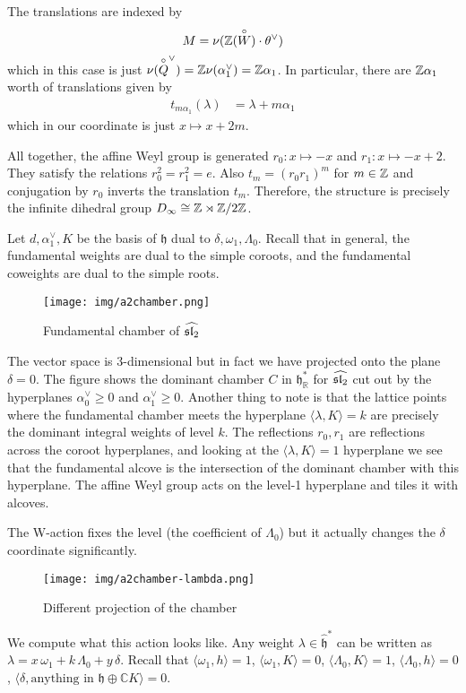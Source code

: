 \documentclass[12pt]{article}
\begin{document}
\begin{example}
The translations are indexed by \[M = \nu(\Z(\overset{\circ}{W})\cdot \theta^\vee)\] which in this case is just $\nu(\overset{\circ}{Q}^\vee) = \Z \nu(\alpha_1^\vee) = \Z \alpha_1$. In particular, there are $\Z\alpha_1$ worth of translations given by \begin{align*}
    t_{m\alpha_1}(\lambda) &= \lambda + m\alpha_1 
\end{align*} which in our coordinate is just $x \mapsto x + 2m$. 

All together, the affine Weyl group is generated $r_0:x \mapsto -x$ and $r_1:x \mapsto -x + 2$. They satisfy the relations $r_0^2 = r_1^2 = e$. Also $t_m = (r_0 r_1)^m$ for $m \in \Z$ and conjugation by $r_0$ inverts the translation $t_m$. Therefore, the structure is precisely the infinite dihedral group $D_\infty \cong \Z \rtimes \Z/2\Z$.
\end{example}

\begin{example}
     Let $d, \alpha_1^\vee, K$ be the basis of $\mathfrak{h}$ dual to $\delta, \omega_1, \Lambda_0$. Recall that in general, the fundamental weights are dual to the simple coroots, and the fundamental coweights are dual to the simple roots.
    \begin{figure}[H]
    \centering
    \texttt{[image: img/a2chamber.png]}
    \caption{Fundamental chamber of $\widehat{\sl_2}$}
\end{figure}
    The vector space is $3$-dimensional but in fact we have projected onto the plane $\delta = 0$. The figure shows the dominant chamber $C$ in $\mathfrak{h}^*_\mathbb{R}$ for $\widehat{\sl_2}$ cut out by the hyperplanes $\alpha_0^\vee \geq 0$ and $\alpha_1^\vee \geq 0$. Another thing to note is that the lattice points where the fundamental chamber meets the hyperplane $\langle \lambda, K \rangle = k$ are precisely the dominant integral weights of level $k$. The reflections $r_0, r_1$ are reflections across the coroot hyperplanes, and looking at the $\langle \lambda, K \rangle = 1$ hyperplane we see that the fundamental alcove is the intersection of the dominant chamber with this hyperplane. The affine Weyl group acts on the level-1 hyperplane and tiles it with alcoves.

The W-action fixes the level (the coefficient of $\Lambda_0$) but it actually changes the $\delta$ coordinate significantly. 
\begin{figure}[H]
    \centering
    \texttt{[image: img/a2chamber-lambda.png]}
    \caption{Different projection of the chamber}
\end{figure}
\end{example}
We compute what this action looks like. Any weight $\lambda\in \widehat{\mathfrak h}^*$ can be written as
$\lambda = x\,\omega_1 + k\,\Lambda_0 + y\,\delta$. Recall that 
$\langle \omega_1, h \rangle = 1$, $\langle \omega_1, K \rangle = 0$, 
$\langle \Lambda_0, K \rangle = 1$, $\langle \Lambda_0, h \rangle = 0$,
$\langle \delta, \text{anything in } \mathfrak h \oplus \mathbb{C}K \rangle = 0$.
\end{document}
